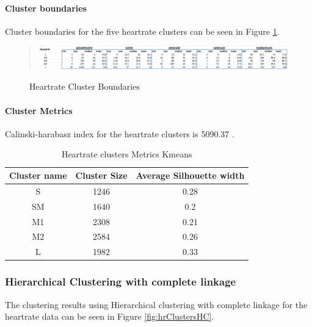 \documentclass{article}
\begin{document}
\paragraph{Cluster boundaries}
Cluster boundaries for the five heartrate clusters can be seen in Figure \ref{fig:hrBoundaries}.

\begin{figure}[H]
  \centering
  \caption{Heartrate Cluster Boundaries}
  \includegraphics[scale=0.5]{hr_cluster_boundaries.png}
  \label{fig:hrBoundaries}
\end{figure}

\paragraph{Cluster Metrics}
Calinski-harabasz index for the heartrate clusters is 5090.37 .

\begin{table}[H]
  \caption{Heartrate clusters Metrics Kmeans}
  \label{hr_metrics}
  \centering
  \begin{tabular}{ |c|c|c|}
    \toprule
    \cmidrule(r){1-2}
    Cluster name & Cluster Size & Average Silhouette width \\
    \midrule
    S & 1246 & 0.28 \\
    SM & 1640 & 0.2 \\
    M1 & 2308 & 0.21 \\
    M2 & 2584 & 0.26 \\
    L & 1982 & 0.33 \\
    \bottomrule
    \end{tabular}
\end{table}

\subsubsection{Hierarchical Clustering with complete linkage}

The clustering results using Hierarchical clustering with complete linkage for the heartrate data can be seen in Figure \ref{fig:hrClustersHC}.
\end{document}
